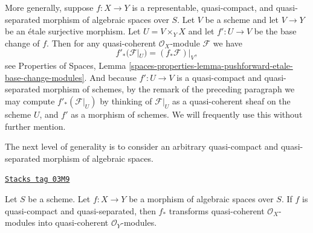 \medskip\noindent
More generally, suppose $f : X \to Y$ is a representable, quasi-compact, and
quasi-separated morphism of algebraic spaces over $S$. Let $V$ be a scheme
and let $V \to Y$ be an \'etale surjective morphism. Let $U = V \times_Y X$
and let $f' : U \to V$ be the base change of $f$. Then for any
quasi-coherent $\mathcal{O}_X$-module $\mathcal{F}$ we have
\begin{equation}
\label{equation-representable-pushforward}
f'_*(\mathcal{F}|_U) = (f_*\mathcal{F})|_V,
\end{equation}
see
Properties of Spaces,
Lemma \ref{spaces-properties-lemma-pushforward-etale-base-change-modules}.
And because $f' : U \to V$ is a quasi-compact and quasi-separated
morphism of schemes, by the remark of the preceding paragraph we may
compute $f'_*(\mathcal{F}|_U)$ by thinking of $\mathcal{F}|_U$ as a
quasi-coherent sheaf on the scheme $U$, and $f'$ as a morphism of schemes.
We will frequently use this without further mention.

\medskip\noindent
The next level of generality is to consider an arbitrary
quasi-compact and quasi-separated morphism of algebraic spaces.

\begin{lemma}[Pushforward]
\label{spaces-morphisms-lemma-pushforward}
\href{https://stacks.math.columbia.edu/tag/03M9}{\texttt{Stacks tag 03M9}}

Let $S$ be a scheme.
Let $f : X \to Y$ be a morphism of algebraic spaces over $S$.
If $f$ is quasi-compact and quasi-separated, then $f_*$ transforms
quasi-coherent $\mathcal{O}_X$-modules into
quasi-coherent $\mathcal{O}_Y$-modules.
\end{lemma}

